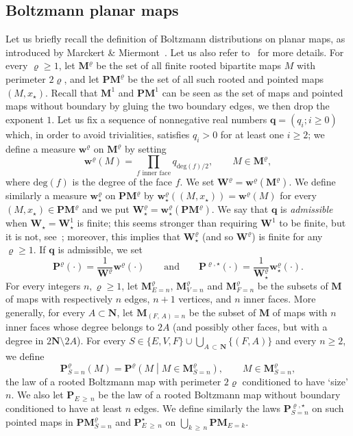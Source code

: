 \documentclass[10pt]{amsart}
\theoremstyle{definition}\newtheorem{defi}[theo]{Definition}\newtheorem{rema}[theo]{Remark}\newtheorem{exam}[theo]{Example}\newtheorem{exem}[theo]{Example}\newtheorem{nota}[theo]{Notation}
\newcommand{\ensembles}[1]{\mathbf{#1}}
\newcommand{\N}{\ensembles{N}}
\renewcommand{\P}{\ensembles{P}}
\newcommand{\1}{\ensembles{1}}
\newcommand{\q}{\mathbf{q}}
\newcommand{\Map}{\mathbf{M}}
\newcommand{\PMap}{\mathbf{PM}}
\newcommand{\bfW}{\mathbf{W}}
\newcommand{\bfww}{\mathbf{w}}
\renewcommand{\ge}{\geqslant}
\newcommand{\degl}{\mathrm{deg}}
\providecommand{\?}{}
\begin{document}
\subsection{Boltzmann planar maps}\label{sec:Boltzmann}

Let us briefly recall the definition of Boltzmann distributions on planar maps, as introduced by Marckert \& Miermont~\cite{MM07}. Let us also refer to~\cite{BM17} for more details. For every $\varrho \ge 1$, let $\Map^{\varrho}$ be the set of all finite rooted bipartite maps $M$ with perimeter $2\varrho$, and let $\PMap^{\varrho}$ be the set of all such rooted and pointed maps $(M, x_\star)$. Recall that $\Map^1$ and $\PMap^1$ can be seen as the set of maps and pointed maps without boundary by gluing the two boundary edges, we then drop the exponent $1$. Let us fix a sequence of nonnegative real numbers $\q = (q_i ; i \ge 0)$ which, in order to avoid trivialities, satisfies $q_i > 0$ for at least one $i \ge 2$; we define a measure $\bfww^{\varrho}$ on $\Map^{\varrho}$ by setting
\[
\bfww^{\varrho}(M) = \prod_{f \text{ inner face}} q_{\degl(f)/2},
\qquad M \in \Map^{\varrho},
\]
where $\degl(f)$ is the degree of the face $f$. We set $\bfW^{\varrho} = \bfww^{\varrho}(\Map^{\varrho})$. We define similarly a measure $\bfww^{\varrho}_\star$ on $\PMap^{\varrho}$ by $\bfww^{\varrho}_\star((M, x_\star)) = \bfww^{\varrho}(M)$ for every $(M, x_\star) \in \PMap^{\varrho}$ and we put $\bfW^{\varrho}_\star = \bfww^{\varrho}_\star(\PMap^{\varrho})$. We say that $\q$ is \emph{admissible} when $\bfW_\star = \bfW_\star^1$ is finite; this seems stronger than requiring $\bfW^1$ to be finite, but it is not, see~\cite{BCM19}; moreover, this implies that $\bfW^\varrho_\star$ (and so $\bfW^\varrho$) is finite for any $\varrho \ge 1$. If $\q$ is admissible, we set
\[
\P^\varrho(\cdot) = \frac{1}{\bfW^\varrho} \bfww^\varrho(\cdot)
\qquad\text{and}\qquad
\P^{\varrho, \star}(\cdot) = \frac{1}{\bfW^\varrho_\star} \bfww^\varrho_\star(\cdot).
\]
For every integers $n, \varrho \ge 1$, let $\Map^\varrho_{E=n}$, $\Map^\varrho_{V=n}$ and $\Map^\varrho_{F=n}$ be the subsets of $\Map$ of maps with respectively $n$ edges, $n+1$ vertices, and $n$ inner faces. More generally, for every $A \subset \N$, let $\Map_{(F,\,A)=n}$ be the subset of $\Map$ of maps with $n$ inner faces whose degree belongs to $2A$ (and possibly other faces, but with a degree in $2\N \setminus 2A$). For every $S \in \{E, V, F\} \cup \bigcup_{A\,\subset\, \N} \{(F,A)\}$ and every $n \ge 2$, we define
\[
\P^\varrho_{S=n}(M) = \P^\varrho\left(M \middle| M \in \Map^\varrho_{S=n}\right),
\qquad M \in \Map^\varrho_{S=n},
\]
the law of a rooted Boltzmann map with perimeter $2 \varrho$ conditioned to have `size' $n$. We also let $\P_{E\,\ge\,n}$ be the law of a rooted Boltzmann map without boundary conditioned to have at least $n$ edges. We define similarly the laws $\P^{\varrho, \star}_{S=n}$ on such pointed maps in $\PMap^\varrho_{S=n}$ and $\P^\star_{E\,\ge\,n}$ on $\bigcup_{k\,\ge\,n} \PMap_{E=k}$.
\end{document}

